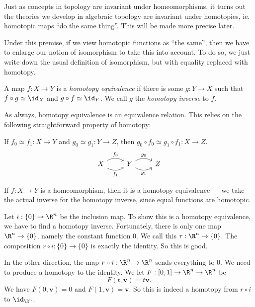 \documentclass[a4paper]{article}
\theoremstyle{definition}
\begin{document}
Just as concepts in topology are invariant under homeomorphisms, it turns out the theories we develop in algebraic topology are invariant under homotopies, ie. homotopic maps ``do the same thing''. This will be made more precise later.

Under this premise, if we view homotopic functions as ``the same'', then we have to enlarge our notion of isomorphism to take this into account. To do so, we just write down the usual definition of isomorphism, but with equality replaced with homotopy.

\begin{defi}
  A map $f: X \to Y$ is a \emph{homotopy equivalence} if there is some $g: Y \to X$ such that $f \circ g \simeq \id_X$ and $g \circ f \simeq \id_Y$. We call $g$ the \emph{homotopy inverse} to $f$.
\end{defi}
As always, homotopy equivalence is an equivalence relation. This relies on the following straightforward property of homotopy:

\begin{prop}
  If $f_0 \simeq f_1: X \to Y$ and $g_0 \simeq g_1: Y \to Z$, then $g_0 \circ f_0 \simeq g_1 \circ f_1: X \to Z$.
  \[
    \begin{tikzcd}
      X \ar[r, bend left, "f_0"] \ar[r, bend right, "f_1"'] & Y \ar[r, bend left, "g_0"] \ar[r, bend right, "g_1"'] & Z
    \end{tikzcd}
  \]
\end{prop}

\begin{eg}
  If $f: X \to Y$ is a homeomorphism, then it is a homotopy equivalence --- we take the actual inverse for the homotopy inverse, since equal functions are homotopic.
\end{eg}

\begin{eg}
  Let $i: \{0\} \to \R^n$ be the inclusion map. To show this is a homotopy equivalence, we have to find a homotopy inverse. Fortunately, there is only one map $\R^n \to \{0\}$, namely the constant function $0$. We call this $r: \R^n \to \{0\}$. The composition $r \circ i: \{0\} \to \{0\}$ is exactly the identity. So this is good.

  In the other direction, the map $r \circ i: \R^n \to \R^n$ sends everything to $0$. We need to produce a homotopy to the identity. We let $F: [0, 1] \to \R^n \to \R^n$ be
  \[
    F(t, \mathbf{v}) = t\mathbf{v}.
  \]
  We have $F(0, \mathbf{v}) = 0$ and $F(1, \mathbf{v}) = \mathbf{v}$. So this is indeed a homotopy from $r \circ i$ to $\id_{\R^n}$.
\end{eg}
\end{document}
